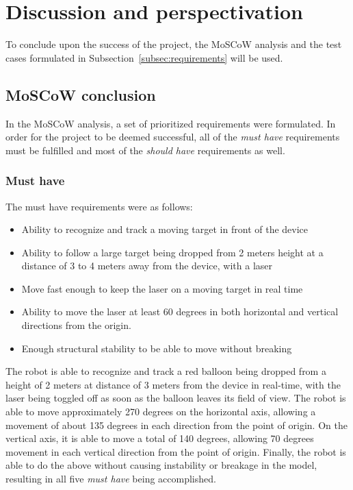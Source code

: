 \section{Discussion and perspectivation}
To conclude upon the success of the project, the MoSCoW analysis and the test cases formulated in Subsection~\ref{subsec:requirements} will be used.

\subsection{MoSCoW conclusion}
In the MoSCoW analysis, a set of prioritized requirements were formulated.
In order for the project to be deemed successful, all of the \textit{must have} requirements must be fulfilled and most of the \textit{should have} requirements as well.

\subsubsection{Must have}
The must have requirements were as follows:
\begin{itemize}
	\item Ability to recognize and track a moving target in front of the device
	\item Ability to follow a large target being dropped from 2 meters height at a distance of 3 to 4 meters away from the device, with a laser
	\item Move fast enough to keep the laser on a moving target in real time
	\item Ability to move the laser at least 60 degrees in both horizontal and vertical directions from the origin.
	\item Enough structural stability to be able to move without breaking
\end{itemize}

The robot is able to recognize and track a red balloon being dropped from a height of 2 meters at distance of 3 meters from the device in real-time, with the laser being toggled off as soon as the balloon leaves its field of view. 
The robot is able to move approximately 270 degrees on the horizontal axis, allowing a movement of about 135 degrees in each direction from the point of origin.
On the vertical axis, it is able to move a total of 140 degrees, allowing 70 degrees movement in each vertical direction from the point of origin.
Finally, the robot is able to do the above without causing instability or breakage in the model, resulting in all five \textit{must have} being accomplished.


